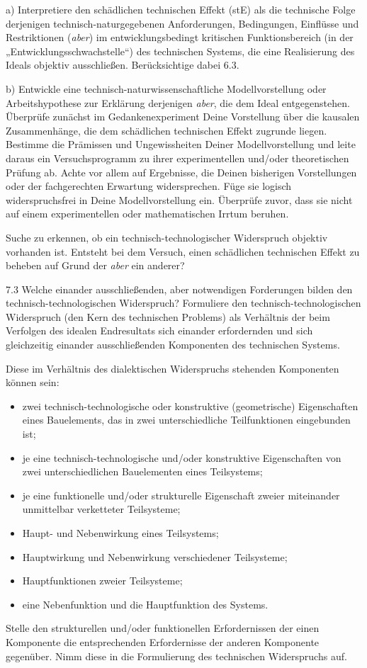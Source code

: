 \documentclass[12pt,a4paper]{article}
\begin{document}
a) Interpretiere den schädlichen technischen Effekt (stE) als die technische
Folge derjenigen technisch-naturgegebenen Anforderungen, Bedingungen, Einflüsse
und Restriktionen (\emph{aber}) im entwicklungsbedingt kritischen
Funktionsbereich (in der „Entwicklungsschwachstelle“) des technischen Systems,
die eine Realisierung des Ideals objektiv ausschließen. Berücksichtige dabei
6.3.

b) Entwickle eine technisch-naturwissenschaftliche Modellvorstellung oder
Arbeitshypothese zur Erklärung derjenigen \emph{aber}, die dem Ideal
entgegenstehen. Überprüfe zunächst im Gedankenexperiment Deine Vorstellung über
die kausalen Zusammenhänge, die dem schädlichen technischen Effekt zugrunde
liegen. Bestimme die Prämissen und Ungewissheiten Deiner Modellvorstellung und
leite daraus ein Versuchsprogramm zu ihrer experimentellen und/oder
theoretischen Prüfung ab. Achte vor allem auf Ergebnisse, die Deinen bisherigen
Vorstellungen oder der fachgerechten Erwartung widersprechen. Füge sie logisch
widerspruchsfrei in Deine Modellvorstellung ein. Überprüfe zuvor, dass sie
nicht auf einem experimentellen oder mathematischen Irrtum beruhen.

Suche zu erkennen, ob ein technisch-technologischer Widerspruch objektiv
vorhanden ist. Entsteht bei dem Versuch, einen schädlichen technischen Effekt
zu beheben auf Grund der \emph{aber} ein anderer?

7.3 Welche einander ausschließenden, aber notwendigen Forderungen bilden den
technisch-technologischen Widerspruch? Formuliere den technisch-technologischen
Widerspruch (den Kern des technischen Problems) als Verhältnis der beim
Verfolgen des idealen Endresultats sich einander erfordernden und sich
gleichzeitig einander ausschließenden Komponenten des technischen Systems.

Diese im Verhältnis des dialektischen Widerspruchs stehenden Komponenten können
sein:
\begin{itemize}
  \item zwei technisch-technologische oder konstruktive (geometrische)
    Eigenschaften eines Bauelements, das in zwei unterschiedliche
    Teilfunktionen eingebunden ist;
  \item je eine technisch-technologische und/oder konstruktive Eigenschaften
    von zwei unterschiedlichen Bauelementen eines Teilsystems;
  \item je eine funktionelle und/oder strukturelle Eigenschaft zweier
    miteinander unmittelbar verketteter Teilsysteme;
  \item Haupt- und Nebenwirkung eines Teilsystems;
  \item Hauptwirkung und Nebenwirkung verschiedener Teilsysteme;
  \item Hauptfunktionen zweier Teilsysteme;
  \item eine Nebenfunktion und die Hauptfunktion des Systems.
\end{itemize}
Stelle den strukturellen und/oder funktionellen Erfordernissen der einen
Komponente die entsprechenden Erfordernisse der anderen Komponente gegenüber.
Nimm diese in die Formulierung des technischen Widerspruchs auf.
\end{document}
